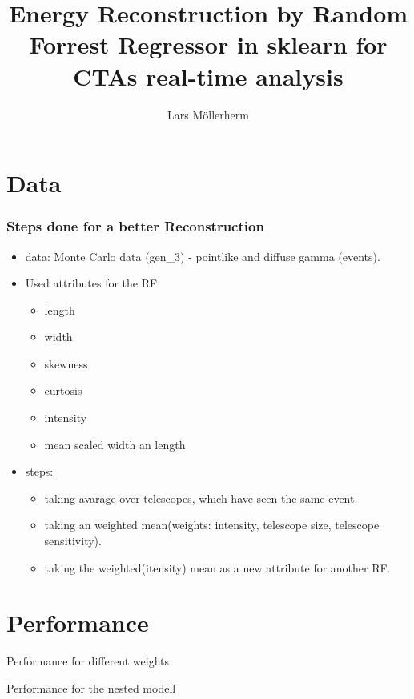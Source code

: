 \documentclass[aspectratio=1610, professionalfonts, 9pt]{beamer}
\title{Energy Reconstruction by Random Forrest Regressor in sklearn for CTAs
real-time analysis}
\author[L.~Möllerherm]{Lars Möllerherm}
\institute[Experimentelle Physik Vb]{Experimentelle Physik Vb \\  Fakultät Physik}
\begin{document}
\maketitle

\section{Data}
  \begin{frame}
    \frametitle{Steps done for a better Reconstruction}
    \begin{itemize}
      \item data: Monte Carlo data (gen_3) - pointlike and diffuse gamma (events).

      \item Used attributes for the RF:
      \begin{itemize}
        \item length
        \item width
        \item skewness
        \item curtosis
        \item intensity
        \item mean scaled width an length
      \end{itemize}

      \item steps:
      \begin{itemize}
        \item taking avarage over telescopes, which have seen the same event.
        \item taking an weighted mean(weights: intensity, telescope size, telescope sensitivity).
        \item taking the weighted(itensity) mean as a new attribute for another RF.
      \end{itemize}
    \end{itemize}

  \end{frame}


\section{Performance}
  \begin{frame}{Performance for different weights}
  \end{frame}


  \begin{frame}{Performance for the nested modell}
  \end{frame}
\end{document}
